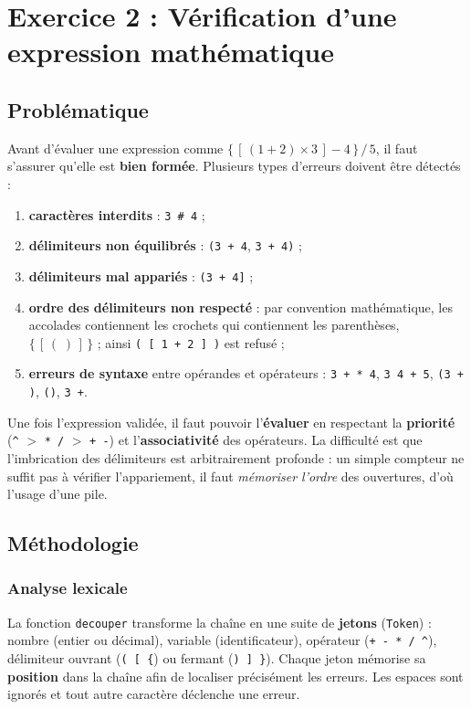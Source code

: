 \documentclass[11pt,a4paper]{article}
\newcommand{\code}[1]{\texttt{#1}}
\begin{document}
\section{Exercice 2 : Vérification d'une expression mathématique}

\subsection{Problématique}

Avant d'évaluer une expression comme
$\{\,[\,(1+2)\times 3\,]-4\,\}\,/\,5$, il faut s'assurer qu'elle est
\textbf{bien formée}. Plusieurs types d'erreurs doivent être détectés :
\begin{enumerate}
  \item \textbf{caractères interdits} : \code{3 \# 4} ;
  \item \textbf{délimiteurs non équilibrés} : \code{(3 + 4}, \code{3 + 4)} ;
  \item \textbf{délimiteurs mal appariés} : \code{(3 + 4]} ;
  \item \textbf{ordre des délimiteurs non respecté} : par convention
        mathématique, les accolades contiennent les crochets qui contiennent
        les parenthèses, $\{\,[\,(\;)\,]\,\}$ ; ainsi \code{( [ 1 + 2 ] )}
        est refusé ;
  \item \textbf{erreurs de syntaxe} entre opérandes et opérateurs :
        \code{3 + * 4}, \code{3 4 + 5}, \code{(3 + )}, \code{()}, \code{3 +}.
\end{enumerate}
Une fois l'expression validée, il faut pouvoir l'\textbf{évaluer} en
respectant la \textbf{priorité} (\code{\textasciicircum} $>$ \code{* /} $>$ \code{+ -}) et
l'\textbf{associativité} des opérateurs. La difficulté est que
l'imbrication des délimiteurs est arbitrairement profonde : un simple
compteur ne suffit pas à vérifier l'appariement, il faut \emph{mémoriser
l'ordre} des ouvertures, d'où l'usage d'une pile.

\subsection{Méthodologie}

\subsubsection{Analyse lexicale}

La fonction \code{decouper} transforme la chaîne en une suite de
\textbf{jetons} (\code{Token}) : nombre (entier ou décimal), variable
(identificateur), opérateur (\code{+ - * / \textasciicircum}), délimiteur
ouvrant (\code{( [ \{}) ou fermant (\code{) ] \}}). Chaque jeton mémorise sa
\textbf{position} dans la chaîne afin de localiser précisément les erreurs.
Les espaces sont ignorés et tout autre caractère déclenche une erreur.
\end{document}
